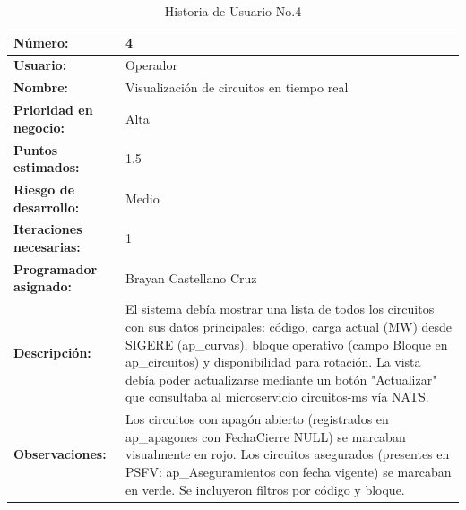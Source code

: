\begin{table}[H]
\centering
\caption{Historia de Usuario No.4}
\label{tab:hu_04}
\footnotesize
\begin{tabular}{|p{3cm}|p{9cm}|}
\hline
\textbf{Número:} & 4 \\
\hline
\textbf{Usuario:} & Operador \\
\hline
\textbf{Nombre:} & Visualización de circuitos en tiempo real \\
\hline
\textbf{Prioridad en negocio:} & Alta \\
\hline
\textbf{Puntos estimados:} & 1.5 \\
\hline
\textbf{Riesgo de desarrollo:} & Medio \\
\hline
\textbf{Iteraciones necesarias:} & 1 \\
\hline
\textbf{Programador asignado:} & Brayan Castellano Cruz \\
\hline
\textbf{Descripción:} & El sistema debía mostrar una lista de todos los circuitos con sus datos principales: código, carga actual (MW) desde SIGERE (ap\_curvas), bloque operativo (campo Bloque en ap\_circuitos) y disponibilidad para rotación. La vista debía poder actualizarse mediante un botón "Actualizar" que consultaba al microservicio circuitos-ms vía NATS. \\
\hline
\textbf{Observaciones:} & Los circuitos con apagón abierto (registrados en ap\_apagones con FechaCierre NULL) se marcaban visualmente en rojo. Los circuitos asegurados (presentes en PSFV: ap\_Aseguramientos con fecha vigente) se marcaban en verde. Se incluyeron filtros por código y bloque. \\
\hline
\end{tabular}
\end{table}

